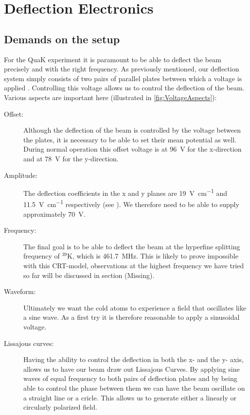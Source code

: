 
\chapter{Deflection Electronics}

\section{Demands on the setup}
For the QuaK experiment it is paramount to be able to deflect the beam precisely and with the right frequency. 
As previously mentioned, our deflection system simply consists of two pairs of parallel plates between which a voltage is applied . Controlling this voltage allows us to control the deflection of the beam. Various aspects are important here (illustrated in \cref{fig:VoltageAspects}):

\begin{description}
	\item[Offset:] Although the deflection of the beam is controlled by the voltage between the plates, it is necessary to be able to set their mean potential as well. During normal operation this offset voltage is at \SI{96}{\volt} for the x-direction and at \SI{78}{\volt} for the y-direction.
	\item[Amplitude:] The deflection coefficients in the x and y planes are \SI{19}{\volt\per\centi\meter} and \SI{11.5}{\volt\per\centi\meter} respectively (see \cite{D14363GY123-manual}). We therefore need to be able to supply approximately \SI{70}{\volt}.
	
	\item[Frequency:] The final goal is to be able to deflect the beam at the hyperfine splitting frequency of $^{39}\mathrm{K}$, which is \SI{461.7}{\mega\hertz}. This is likely to prove impossible with this CRT-model, observations at the highest frequency we have tried so far will be discussed in section (Missing).
	
	\item[Waveform:] Ultimately we want the cold atoms to experience a field that oscillates like a sine wave. As a first try it is therefore reasonable to apply a sinusoidal voltage.
	\item[Lissajous curves:] Having the ability to control the deflection in both the x- and the y- axis, allows us to have our beam draw out Lissajous Curves. By applying sine waves of equal frequency to both pairs of deflection plates and by being able to control the phase between them we can have the beam oscillate on a straight line or a cricle. This allows us to generate either a linearly or circularly polarized field.
\end{description}

